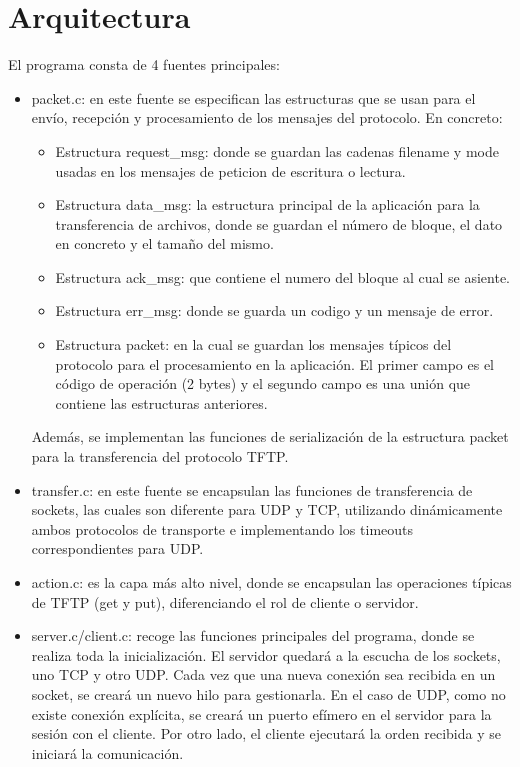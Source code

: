 \documentclass[journal, a4paper]{IEEEtran}
\begin{document}
\section{Arquitectura}
	El programa consta de 4 fuentes principales:
	\begin{itemize}
	\item packet.c: en este fuente se especifican las estructuras que se usan para el envío, recepción y procesamiento de los mensajes del protocolo. En concreto: 
	\begin{itemize}
	\item Estructura request\_msg: donde se guardan las cadenas filename y mode usadas en los mensajes de peticion de escritura o lectura. 
	\item Estructura data\_msg: la estructura principal de la aplicación para la transferencia de archivos, donde se guardan el número de bloque, el dato en concreto y el tamaño del mismo. 
	\item Estructura ack\_msg: que contiene el numero del bloque al cual se asiente. 
	\item Estructura err\_msg: donde se guarda un codigo y un mensaje de error. 
	\item Estructura packet: en la cual se guardan los mensajes típicos del protocolo para el procesamiento en la aplicación. El primer campo es el código de operación (2 bytes) y el segundo campo es una unión que contiene las estructuras anteriores.
	\end{itemize}
	Además, se implementan las funciones de serialización de la estructura packet para la transferencia del protocolo TFTP. 	
	\item transfer.c: en este fuente se encapsulan las funciones de transferencia de sockets, las cuales son diferente para UDP y TCP, utilizando dinámicamente ambos protocolos de transporte e implementando los timeouts correspondientes para UDP. 
	\item action.c: es la capa más alto nivel, donde se encapsulan las operaciones típicas de TFTP (get y put), diferenciando el rol de cliente o servidor.
	\item server.c/client.c: recoge las funciones principales del programa, donde se realiza toda la inicialización. El servidor quedará a la escucha de los sockets, uno TCP y otro UDP. Cada vez que una nueva conexión sea recibida en un socket, se creará un nuevo hilo para gestionarla. En el caso de UDP, como no existe conexión explícita, se creará un puerto efímero en el servidor para la sesión con el cliente. Por otro lado, el cliente ejecutará la orden recibida y se iniciará la comunicación.
	\end{itemize}
\end{document}
